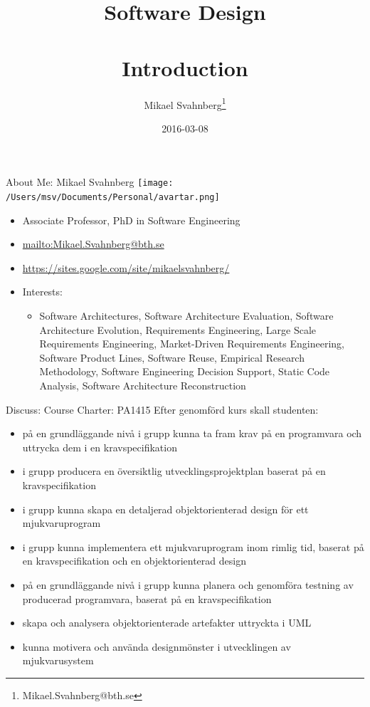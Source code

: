 \documentclass[10pt,t,a4paper]{beamer}
\author{Mikael Svahnberg\thanks{Mikael.Svahnberg@bth.se}}
\date{2016-03-08}
\title{Software Design\\\\Introduction}
\begin{document}
\maketitle

\begin{frame}[label=sec-1]{About Me: Mikael Svahnberg}
\texttt{[image: /Users/msv/Documents/Personal/avartar.png]}
\begin{itemize}
\item Associate Professor, PhD in Software Engineering
\item \url{mailto:Mikael.Svahnberg@bth.se}
\item \url{https://sites.google.com/site/mikaelsvahnberg/}
\item Interests:
\begin{itemize}
\item Software Architectures, Software Architecture Evaluation, Software Architecture Evolution, Requirements Engineering, Large Scale Requirements Engineering, Market-Driven Requirements Engineering, Software Product Lines, Software Reuse, Empirical Research Methodology, Software Engineering Decision Support, Static Code Analysis, Software Architecture Reconstruction
\end{itemize}
\end{itemize}
\end{frame}
\begin{frame}[label=sec-2]{Discuss: Course Charter: PA1415}
Efter genomförd kurs skall studenten:
\begin{itemize}
\item på en grundläggande nivå i grupp kunna ta fram krav på en programvara och uttrycka dem i en kravspecifikation
\item i grupp producera en översiktlig utvecklingsprojektplan baserat på en kravspecifikation
\item i grupp kunna skapa en detaljerad objektorienterad design för ett mjukvaruprogram
\item i grupp kunna implementera ett mjukvaruprogram inom rimlig tid, baserat på en kravspecifikation och en objektorienterad design
\item på en grundläggande nivå i grupp kunna planera och genomföra testning av producerad programvara, baserat på en kravspecifikation
\item skapa och analysera objektorienterade artefakter uttryckta i UML
\item kunna motivera och använda designmönster i utvecklingen av mjukvarusystem
\end{itemize}
\end{frame}
\end{document}
